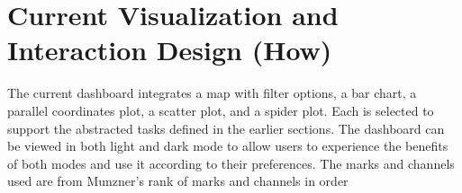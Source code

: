 \documentclass{vgtc}                          %
\begin{document}
\medskip


\section{Current Visualization and Interaction Design (How)}


The current dashboard integrates a map with filter options, a bar chart, a parallel coordinates plot, a scatter plot, and a spider plot. Each is selected to support the abstracted tasks defined in the earlier sections. The dashboard can be viewed in both light and dark mode to allow users to experience the benefits of both modes and use it according to their preferences. The marks and channels used are from Munzner's rank of marks and channels in order \cite{munzner2014visualization}
\smallskip
\end{document}
